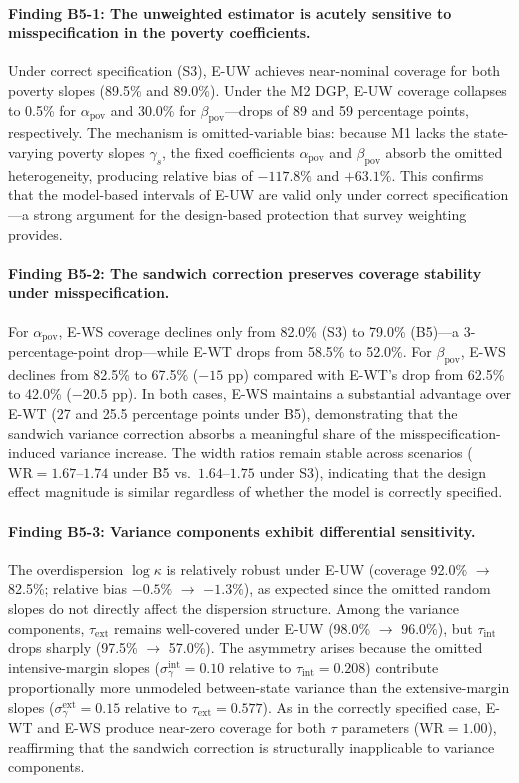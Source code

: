 \paragraph{Finding B5-1: The unweighted estimator is acutely sensitive
to misspecification in the poverty coefficients.}
Under correct specification (S3), E-UW achieves near-nominal coverage
for both poverty slopes (89.5\% and 89.0\%).  Under the M2 DGP, E-UW
coverage collapses to 0.5\% for $\alpha_{\mathrm{pov}}$ and 30.0\%
for $\beta_{\mathrm{pov}}$---drops of 89 and 59 percentage points,
respectively.  The mechanism is omitted-variable bias: because M1
lacks the state-varying poverty slopes $\gamma_s$, the fixed
coefficients $\alpha_{\mathrm{pov}}$ and $\beta_{\mathrm{pov}}$ absorb
the omitted heterogeneity, producing relative bias of $-117.8\%$ and
$+63.1\%$.  This confirms that the model-based intervals of E-UW are
valid only under correct specification---a strong argument for the
design-based protection that survey weighting provides.

\paragraph{Finding B5-2: The sandwich correction preserves coverage
stability under misspecification.}
For $\alpha_{\mathrm{pov}}$, E-WS coverage declines only from 82.0\%
(S3) to 79.0\% (B5)---a 3-percentage-point drop---while E-WT drops
from 58.5\% to 52.0\%.  For $\beta_{\mathrm{pov}}$, E-WS declines
from 82.5\% to 67.5\% ($-15$ pp) compared with E-WT's drop from
62.5\% to 42.0\% ($-20.5$ pp).  In both cases, E-WS maintains a
substantial advantage over E-WT (27 and 25.5 percentage points under
B5), demonstrating that the sandwich variance correction absorbs a
meaningful share of the misspecification-induced variance increase.
The width ratios remain stable across scenarios
($\mathrm{WR} = 1.67\text{--}1.74$ under B5 vs.\ $1.64\text{--}1.75$
under S3), indicating that the design effect magnitude is similar
regardless of whether the model is correctly specified.

\paragraph{Finding B5-3: Variance components exhibit differential
sensitivity.}
The overdispersion $\log\kappa$ is relatively robust under E-UW
(coverage 92.0\% $\to$ 82.5\%; relative bias $-0.5\%$ $\to$ $-1.3\%$),
as expected since the omitted random slopes do not directly affect the
dispersion structure.  Among the variance components,
$\tau_{\mathrm{ext}}$ remains well-covered under E-UW (98.0\% $\to$
96.0\%), but $\tau_{\mathrm{int}}$ drops sharply (97.5\% $\to$
57.0\%).  The asymmetry arises because the omitted intensive-margin
slopes ($\sigma_{\gamma}^{\mathrm{int}} = 0.10$ relative to
$\tau_{\mathrm{int}} = 0.208$) contribute proportionally more
unmodeled between-state variance than the extensive-margin slopes
($\sigma_{\gamma}^{\mathrm{ext}} = 0.15$ relative to
$\tau_{\mathrm{ext}} = 0.577$).  As in the correctly specified case,
E-WT and E-WS produce near-zero coverage for both $\tau$ parameters
($\mathrm{WR} = 1.00$), reaffirming that the sandwich correction is
structurally inapplicable to variance components.

